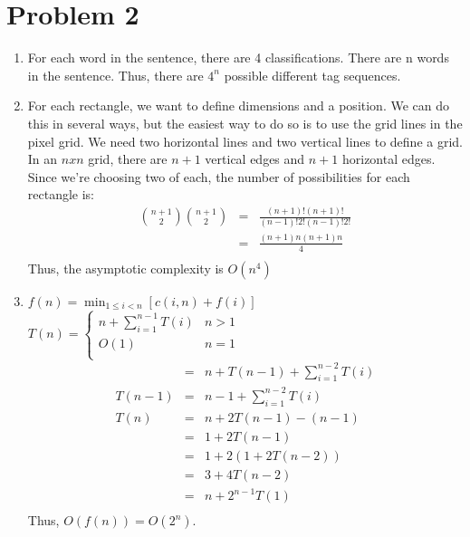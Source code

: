 \documentclass[12pt]{article}
\begin{document}
\section*{Problem 2}

\begin{enumerate}[label=(\alph*)]
  \item For each word in the sentence, there are 4 classifications. There are n words in the sentence. Thus, there are $4^n$ possible different tag sequences.
  
  \item For each rectangle, we want to define dimensions and a position. We can do this in several ways, but the easiest way to do so is to use the grid lines in the pixel grid. We need two horizontal lines and two vertical lines to define a grid. In an $n x n$ grid, there are $n + 1$ vertical edges and $n + 1$ horizontal edges. Since we're choosing two of each, the number of possibilities for each rectangle is:
  \begin{eqnarray*}
  \binom{n+1}{2}\binom{n+1}{2} &=& \frac{(n+1)!(n+1)!}{(n-1)!2!(n-1)!2!}\\
  &=& \frac{(n+1)n(n+1)n}{4}\\
  \end{eqnarray*}
  Thus, the asymptotic complexity is $O(n^4)$

  \item $f(n) = \min_{1 ≤ i < n} [c(i, n) + f(i)]$\\
  $T(n) = \left \{
     \begin{array}{lr}
       n + \displaystyle\sum\limits_{i=1}^{n-1} T(i) & n > 1\\
       O(1) & n = 1\\
     \end{array}
   \right.
   $
  \begin{eqnarray*}
  &=& n + T(n-1) + \displaystyle\sum\limits_{i=1}^{n-2} T(i)\\
  T(n-1) &=& n - 1 + \displaystyle\sum\limits_{i=1}^{n-2} T(i)\\
  T(n) &=& n + 2T(n-1) - (n-1)\\
  &=& 1 + 2T(n-1)\\
  &=& 1 + 2(1 + 2T(n-2))\\
  &=& 3 + 4T(n-2)\\
  &=& n + 2^{n-1} T(1)\\
  \end{eqnarray*}
  Thus, $O(f(n)) = O(2^n)$.
\end{enumerate}
\end{document}
